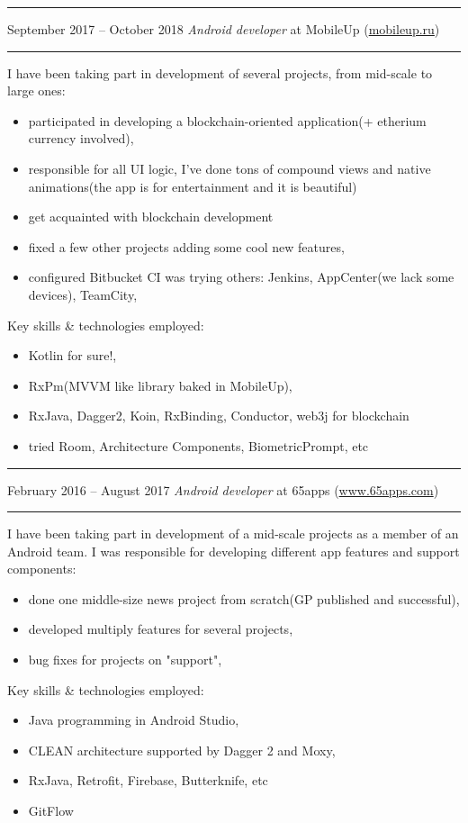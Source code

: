 \documentclass[11pt]{article}
\newcommand\CvSmallSkipLength{0.5em}
\newcommand\CvSkip[1]{\vspace{#1}}
\newcommand\CvSmallSkip{\CvSkip{\CvSmallSkipLength}}
\newcommand\CvRule{\begingroup\color{CvRuleColor}\hrule\endgroup}
\newcommand\CvWorkplaceHeader[5]{\begingroup%
  \CvRule%
  \fboxsep0pt%
  \colorbox{CvWorkplaceHeaderColor}{%
    \begin{minipage}{\linewidth-2\fboxsep}%
\CvSmallSkip%
#1 -- #2 \hfill \textit{#3} at #4 (\href{http://#5/}{#5})%
\CvSmallSkip%
    \end{minipage}%
  }%
  \CvRule%
\endgroup%
}
\newenvironment{CvWorkplaceDescription}{%
    \begingroup\setlength\parskip{\CvSmallSkipLength}%
  }{%
    \CvSmallSkip\endgroup%
  }
\begin{document}
\CvWorkplaceHeader{September 2017}{October 2018}{Android developer}{MobileUp}{mobileup.ru}

\begin{CvWorkplaceDescription}
I have been taking part in development of several projects, from mid-scale to large ones:
\begin{itemize}[noitemsep]
  \item participated in developing a blockchain-oriented application(+ etherium currency involved),
  \item responsible for all UI logic, I've done tons of compound views and native animations(the app is for entertainment and it is beautiful)
  \item get acquainted with blockchain development
  \item fixed a few other projects adding some cool new features,
  \item configured Bitbucket CI was trying others: Jenkins, AppCenter(we lack some devices), TeamCity,
\end{itemize}

Key skills \& technologies employed:
\begin{itemize}[noitemsep]
  \item Kotlin for sure!,
  \item RxPm(MVVM like library baked in MobileUp),
  \item RxJava, Dagger2, Koin, RxBinding, Conductor, web3j for blockchain
  \item tried Room, Architecture Components, BiometricPrompt, etc
\end{itemize}
\end{CvWorkplaceDescription}

\CvWorkplaceHeader{February 2016}{August 2017}{Android developer}{65apps}{www.65apps.com}

\begin{CvWorkplaceDescription}
I have been taking part in development of a mid-scale projects as a member of an Android team. I was responsible for developing different app features and support components:
\begin{itemize}[noitemsep]
  \item done one middle-size news project from scratch(GP published and successful),
  \item developed multiply features for several projects,
  \item bug fixes for projects on "support",
\end{itemize}

Key skills \& technologies employed:
\begin{itemize}[noitemsep]
  \item Java programming in Android Studio,
  \item CLEAN architecture supported by Dagger 2 and Moxy,
  \item RxJava, Retrofit, Firebase, Butterknife, etc
  \item GitFlow
\end{itemize}
\end{CvWorkplaceDescription}
\end{document}
